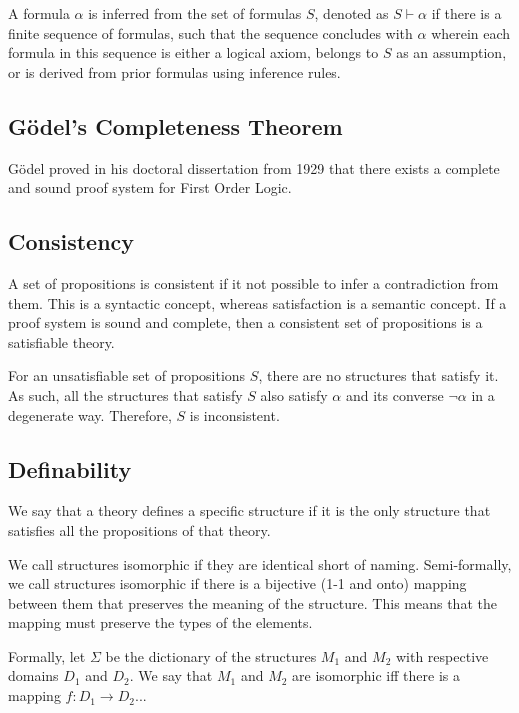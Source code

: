\documentclass{idc_msc}
\begin{document}
A formula \(\alpha\) is inferred from the set of formulas \(S\), denoted as \(S \vdash \alpha\) if there is a finite sequence of formulas, such that the sequence concludes with \(\alpha\) wherein each formula in this sequence is either a logical axiom, belongs to \(S\) as an assumption, or is derived from prior formulas using inference rules.

\subsection{G\"odel's Completeness Theorem}

G\"odel proved in his doctoral dissertation from 1929 that there exists a complete and sound proof system for First Order Logic.



\subsection{Consistency}

A set of propositions is consistent if it not possible to infer a contradiction from them.
This is a syntactic concept, whereas satisfaction is a semantic concept.
If a proof system is sound and complete, then a consistent set of propositions is a satisfiable theory.

For an unsatisfiable set of propositions \(S\), there are no structures that satisfy it.
As such, all the structures that satisfy \(S\) also satisfy \(\alpha\) and its converse \(\lnot \alpha\) in a degenerate way.
Therefore, \(S\) is inconsistent.

\subsection{Definability}

We say that a theory defines a specific structure if it is the only structure that satisfies all the propositions of that theory.

We call structures isomorphic if they are identical short of naming.
Semi-formally, we call structures isomorphic if there is a bijective (1-1 and onto) mapping between them that preserves the meaning of the structure.
This means that the mapping must preserve the types of the elements.

Formally, let \(\Sigma\) be the dictionary of the structures \(M_1\) and \(M_2\) with respective domains \(D_1\) and \(D_2\).
We say that \(M_1\) and \(M_2\) are isomorphic iff there is a mapping \(f : D_1 \to D_2\)...
\end{document}
